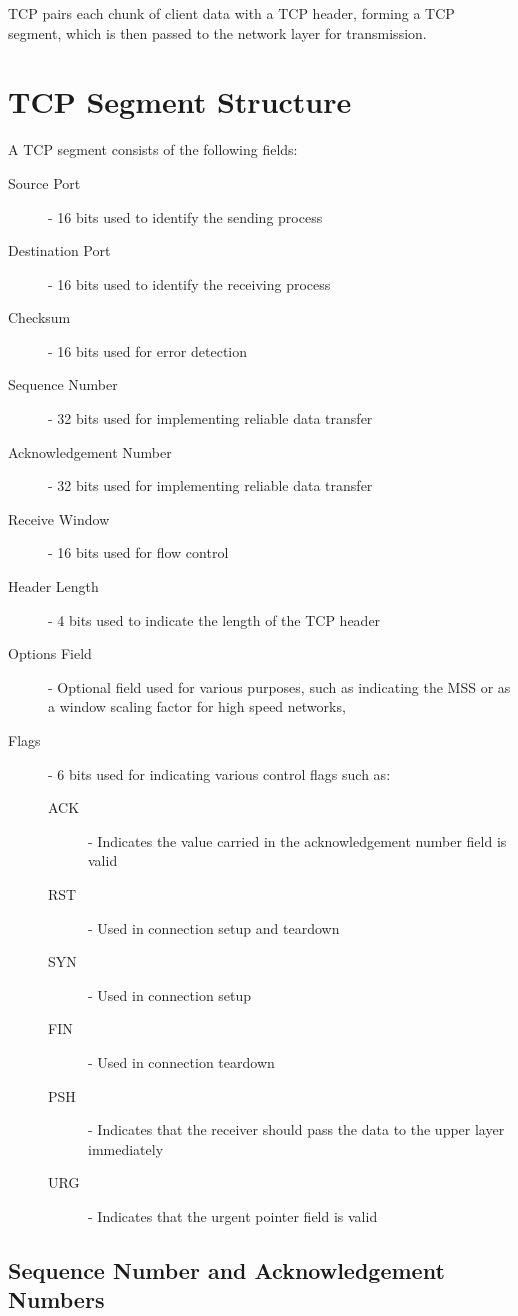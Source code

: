 \documentclass[12pt letter]{report}
\begin{document}
TCP pairs each chunk of client data with a TCP header, forming a TCP
segment, which is then passed to the network layer for transmission.

\section{TCP Segment Structure}

A TCP segment consists of the following fields:
\begin{description}
  \item[Source Port] - 16 bits used to identify the sending process
  \item[Destination Port] - 16 bits used to identify the receiving process
  \item[Checksum] - 16 bits used for error detection
  \item[Sequence Number] - 32 bits used for implementing reliable data transfer
  \item[Acknowledgement Number] - 32 bits used for implementing
    reliable data transfer
  \item[Receive Window] - 16 bits used for flow control
  \item[Header Length] - 4 bits used to indicate the length of the TCP header
  \item[Options Field] - Optional field used for various purposes,
    such as indicating the MSS
    or as a window scaling factor for high speed networks,
  \item[Flags] - 6 bits used for indicating various control flags such as:
    \begin{description}
      \item[ACK]  - Indicates the value carried in the
        acknowledgement number field is valid
      \item[RST] - Used in connection setup and teardown
      \item[SYN] - Used in connection setup
      \item[FIN] - Used in connection teardown
      \item[PSH] - Indicates that the receiver should pass the data
        to the upper layer immediately
      \item[URG] - Indicates that the urgent pointer field is valid
    \end{description}
\end{description}

\subsection{Sequence Number and Acknowledgement Numbers}
\end{document}
